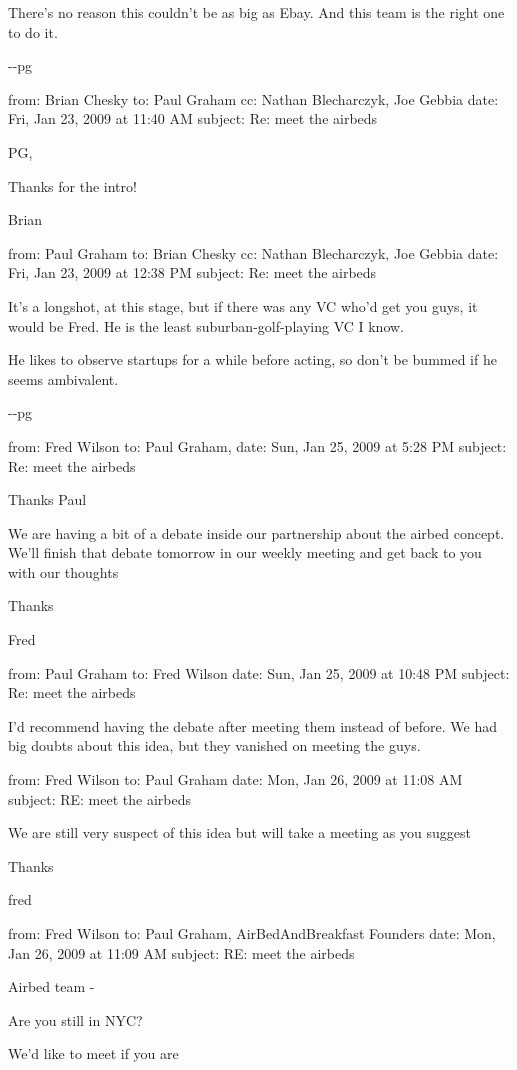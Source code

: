 There's no reason this couldn't be as big as Ebay. And this team is the
right one to do it.

-\/-pg

from: Brian Chesky to: Paul Graham cc: Nathan Blecharczyk, Joe Gebbia
date: Fri, Jan 23, 2009 at 11:40 AM subject: Re: meet the airbeds

PG,

Thanks for the intro!

Brian

from: Paul Graham to: Brian Chesky cc: Nathan Blecharczyk, Joe Gebbia
date: Fri, Jan 23, 2009 at 12:38 PM subject: Re: meet the airbeds

It's a longshot, at this stage, but if there was any VC who'd get you
guys, it would be Fred. He is the least suburban-golf-playing VC I know.

He likes to observe startups for a while before acting, so don't be
bummed if he seems ambivalent.

-\/-pg

from: Fred Wilson to: Paul Graham, date: Sun, Jan 25, 2009 at 5:28 PM
subject: Re: meet the airbeds

Thanks Paul

We are having a bit of a debate inside our partnership about the airbed
concept. We'll finish that debate tomorrow in our weekly meeting and get
back to you with our thoughts

Thanks

Fred

from: Paul Graham to: Fred Wilson date: Sun, Jan 25, 2009 at 10:48 PM
subject: Re: meet the airbeds

I'd recommend having the debate after meeting them instead of before. We
had big doubts about this idea, but they vanished on meeting the guys.

from: Fred Wilson to: Paul Graham date: Mon, Jan 26, 2009 at 11:08 AM
subject: RE: meet the airbeds

We are still very suspect of this idea but will take a meeting as you
suggest

Thanks

fred

from: Fred Wilson to: Paul Graham, AirBedAndBreakfast Founders date:
Mon, Jan 26, 2009 at 11:09 AM subject: RE: meet the airbeds

Airbed team -

Are you still in NYC?

We'd like to meet if you are

